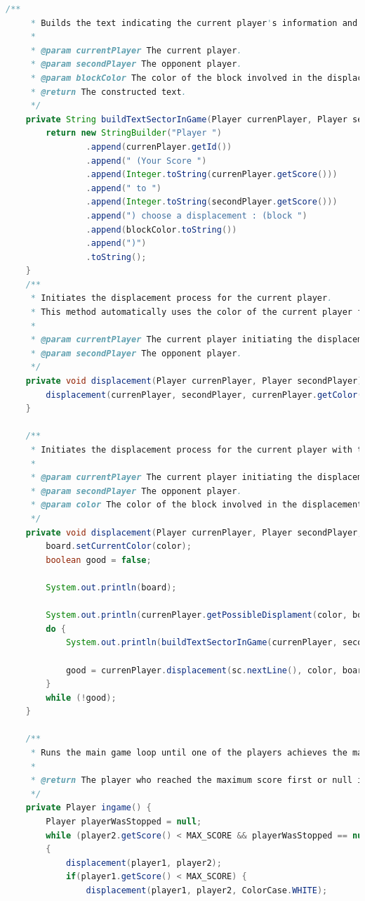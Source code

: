 \documentclass[a4paper,11pt]{article}
\begin{document}
\begin{lstlisting}[language=Java, breaklines=true]
    /**
     * Builds the text indicating the current player's information and prompt for displacement.
     *
     * @param currentPlayer The current player.
     * @param secondPlayer The opponent player.
     * @param blockColor The color of the block involved in the displacement.
     * @return The constructed text.
     */
    private String buildTextSectorInGame(Player currenPlayer, Player secondPlayer, ColorCase blockColor) {
        return new StringBuilder("Player ")
                .append(currenPlayer.getId())
                .append(" (Your Score ")
                .append(Integer.toString(currenPlayer.getScore()))
                .append(" to ")
                .append(Integer.toString(secondPlayer.getScore()))
                .append(") choose a displacement : (block ")
                .append(blockColor.toString())
                .append(")")
                .toString();
    }
    /**
     * Initiates the displacement process for the current player.
     * This method automatically uses the color of the current player for the displacement.
     *
     * @param currentPlayer The current player initiating the displacement.
     * @param secondPlayer The opponent player.
     */
    private void displacement(Player currenPlayer, Player secondPlayer) {
        displacement(currenPlayer, secondPlayer, currenPlayer.getColor());
    }

    /**
     * Initiates the displacement process for the current player with the specified color.
     *
     * @param currentPlayer The current player initiating the displacement.
     * @param secondPlayer The opponent player.
     * @param color The color of the block involved in the displacement.
     */
    private void displacement(Player currenPlayer, Player secondPlayer, ColorCase color) {
        board.setCurrentColor(color);
        boolean good = false;

        System.out.println(board);

        System.out.println(currenPlayer.getPossibleDisplament(color, board));
        do {
            System.out.println(buildTextSectorInGame(currenPlayer, secondPlayer, color));

            good = currenPlayer.displacement(sc.nextLine(), color, board);
        }
        while (!good);
    }

    /**
     * Runs the main game loop until one of the players achieves the maximum score or the game ends.
     *
     * @return The player who reached the maximum score first or null if the game ends without a winner.
     */
    private Player ingame() {
        Player playerWasStopped = null;
        while (player2.getScore() < MAX_SCORE && playerWasStopped == null)
        {
            displacement(player1, player2);
            if(player1.getScore() < MAX_SCORE) {
                displacement(player1, player2, ColorCase.WHITE);


\end{lstlisting}
\end{document}
